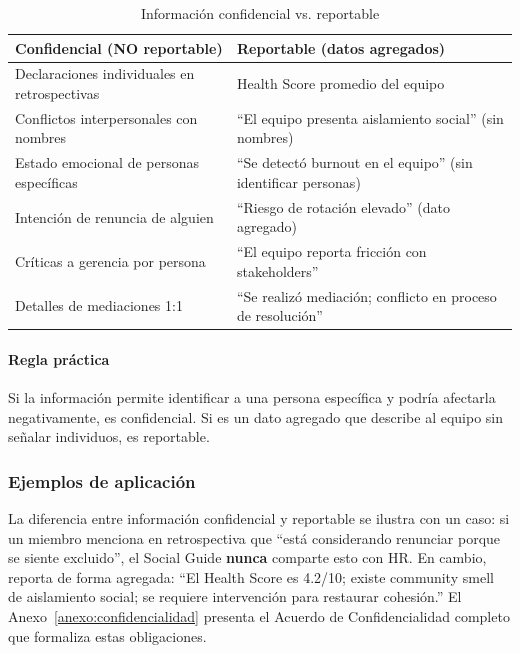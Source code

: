 \begin{table}[h]
    \centering
    \small
    \begin{tabularx}{\textwidth}{|X|X|}
        \hline
        \textbf{Confidencial (NO reportable)} & \textbf{Reportable (datos agregados)}                        \\
        \hline
        Declaraciones individuales en retrospectivas
                                              & Health Score promedio del equipo                             \\
        \hline
        Conflictos interpersonales con nombres
                                              & “El equipo presenta aislamiento social” (sin nombres)        \\
        \hline
        Estado emocional de personas específicas
                                              & “Se detectó burnout en el equipo” (sin identificar personas) \\
        \hline
        Intención de renuncia de alguien
                                              & “Riesgo de rotación elevado” (dato agregado)                 \\
        \hline
        Críticas a gerencia por persona
                                              & “El equipo reporta fricción con stakeholders”                \\
        \hline
        Detalles de mediaciones 1:1
                                              & “Se realizó mediación; conflicto en proceso de resolución”   \\
        \hline
    \end{tabularx}
    \caption{Información confidencial vs. reportable}
    \label{tab:confidencial-reportable}
\end{table}
\FloatBarrier

\paragraph{Regla práctica}
Si la información permite identificar a una persona específica y podría afectarla negativamente, es confidencial. Si es un dato agregado que describe al equipo sin señalar individuos, es reportable.

\subsubsection{Ejemplos de aplicación}

La diferencia entre información confidencial y reportable se ilustra con un caso: si un miembro menciona en retrospectiva que ``está considerando renunciar porque se siente excluido'', el Social Guide \textbf{nunca} comparte esto con HR. En cambio, reporta de forma agregada: ``El Health Score es 4.2/10; existe community smell de aislamiento social; se requiere intervención para restaurar cohesión.'' El Anexo~\ref{anexo:confidencialidad} presenta el Acuerdo de Confidencialidad completo que formaliza estas obligaciones.

